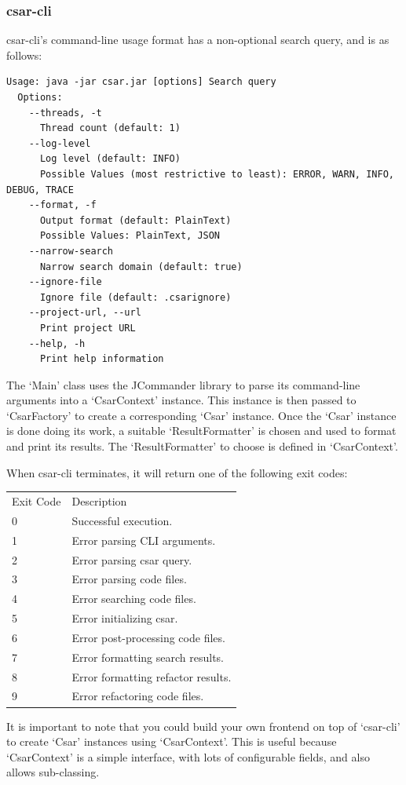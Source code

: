 \documentclass[12pt, letterpaper]{article}
\begin{document}
\subsubsection{csar-cli}
csar-cli's command-line usage format has a non-optional search query, and is as follows:
\begin{lstlisting}
Usage: java -jar csar.jar [options] Search query
  Options:
    --threads, -t
      Thread count (default: 1)
    --log-level
      Log level (default: INFO)
      Possible Values (most restrictive to least): ERROR, WARN, INFO, DEBUG, TRACE
    --format, -f
      Output format (default: PlainText)
      Possible Values: PlainText, JSON
    --narrow-search
      Narrow search domain (default: true)
    --ignore-file
      Ignore file (default: .csarignore)
    --project-url, --url
      Print project URL
    --help, -h
      Print help information
\end{lstlisting}

The `Main' class uses the JCommander library to parse its command-line arguments into a `CsarContext' instance.
This instance is then passed to `CsarFactory' to create a corresponding `Csar' instance.
Once the `Csar' instance is done doing its work, a suitable `ResultFormatter' is chosen and used to format and print its results.
The `ResultFormatter' to choose is defined in `CsarContext'.

When csar-cli terminates, it will return one of the following exit codes:

\begin{tabular}{ l l }
  Exit Code & Description \\
  0 & Successful execution. \\
  1 & Error parsing CLI arguments. \\
  2 & Error parsing csar query. \\
  3 & Error parsing code files. \\
  4 & Error searching code files. \\
  5 & Error initializing csar. \\
  6 & Error post-processing code files. \\
  7 & Error formatting search results. \\
  8 & Error formatting refactor results. \\
  9 & Error refactoring code files. \\
\end{tabular}

It is important to note that you could build your own frontend on top of `csar-cli' to create `Csar' instances using `CsarContext'.
This is useful because `CsarContext' is a simple interface, with lots of configurable fields, and also allows sub-classing.
\end{document}
